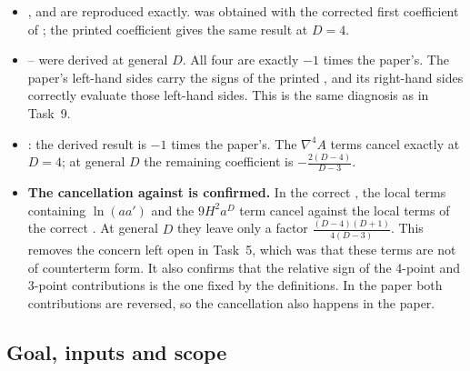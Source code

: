 \begin{discbox}
\begin{itemize}[leftmargin=1.2em,itemsep=2pt]
\item {},  and  are reproduced exactly.
 was obtained with the corrected first coefficient of ; the printed coefficient gives the same result at $D=4$.
\item {}-- were derived at general $D$. All four are exactly $-1$ times the paper's.
The paper's left-hand sides carry the signs of the printed , and its right-hand sides correctly evaluate those left-hand sides.
This is the same diagnosis as in Task~9.
\item {}: the derived result is $-1$ times the paper's.
The $\nabla^4A$ terms cancel exactly at $D=4$; at general $D$ the remaining coefficient is $-\frac{2(D-4)}{D-3}$.
\item \textbf{The cancellation against  is confirmed.}
In the correct , the local terms containing $\ln(aa')$ and the $9H^2a^D$ term cancel against the local terms of the correct .
At general $D$ they leave only a factor $\frac{(D-4)(D+1)}{4(D-3)}$.
This removes the concern left open in Task~5, which was that these terms are not of counterterm form.
It also confirms that the relative sign of the 4-point and 3-point contributions is the one fixed by the definitions.
In the paper both contributions are reversed, so the cancellation also happens in the paper.
\end{itemize}
\end{discbox}

\subsection{Goal, inputs and scope}

